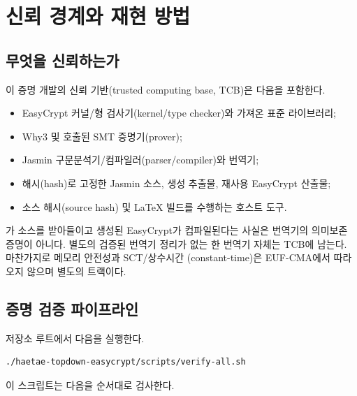 \section{신뢰 경계와 재현 방법}
\label{sec:trust-reproduction}

\subsection{무엇을 신뢰하는가}

이 증명 개발의 신뢰 기반(trusted computing base, TCB)은 다음을 포함한다.

\begin{itemize}
  \item EasyCrypt 커널/형 검사기(kernel/type checker)와 가져온 표준 라이브러리;
  \item Why3 및 호출된 SMT 증명기(prover);
  \item Jasmin 구문분석기/컴파일러(parser/compiler)와 
        번역기;
  \item 해시(hash)로 고정한 Jasmin 소스, 생성 추출물, 재사용 EasyCrypt 산출물;
  \item 소스 해시(source hash) 및 LaTeX 빌드를 수행하는 호스트 도구.
\end{itemize}

가 소스를 받아들이고 생성된 EasyCrypt가 컴파일된다는
사실은 번역기의 의미보존 증명이 아니다. 별도의 검증된 번역기 정리가 없는 한
번역기 자체는 TCB에 남는다. 마찬가지로 메모리 안전성과 SCT/상수시간
(constant-time)은
EUF-CMA에서 따라오지 않으며 별도의 트랙이다.

\subsection{증명 검증 파이프라인}

저장소 루트에서 다음을 실행한다.

\begin{verbatim}
./haetae-topdown-easycrypt/scripts/verify-all.sh
\end{verbatim}

이 스크립트는 다음을 순서대로 검사한다.

